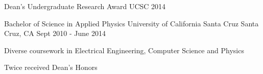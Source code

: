 \begin{cvhonors}
  \cvhonor
    {Dean's Undergraduate Research Award}
    {}
    {UCSC}
    {2014}
\end{cvhonors}
\begin{cventries}
  \cventry
    {Bachelor of Science in Applied Physics}
    {University of California Santa Cruz}
    {Santa Cruz, CA}
    {Sept 2010 - June 2014}
    {
      \begin{cvitems}
        \item {Diverse coursework in Electrical Engineering, Computer Science and Physics}
        \item{Twice received Dean's Honors}
      \end{cvitems}
    }
\end{cventries}
